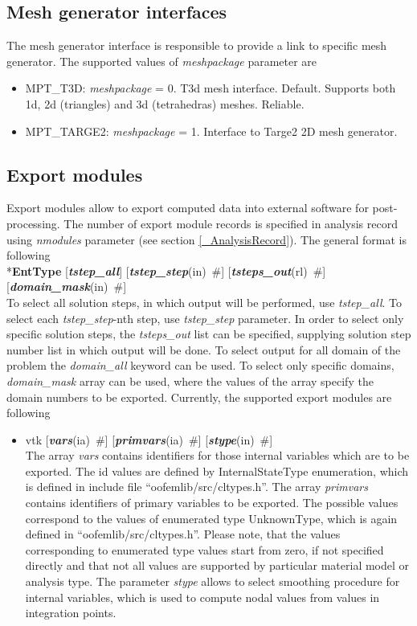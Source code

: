\documentclass[draft]{article}
\newcommand{\param}[1]{{\em #1}}
\newcommand{\keywordnotype}[1]{\mbox{{\it{\bf{#1}}}}}
\newcommand{\keyword}[2]{\mbox{{\keywordnotype{#1}\tiny (#2)}}}
\newcommand{\entKeyword}[1]{\mbox{{*{\bf{#1}}}}}
\newcommand{\field}[2]{\mbox{\keyword{#1}{#2}~\#}}
\newcommand{\optField}[2]{\mbox{[\field{#1}{#2}]}}
\begin{document}
\subsection{Mesh generator interfaces}
\label{meshpackages}
The mesh generator interface is responsible to provide a link to
specific mesh generator. The supported values of \param{meshpackage}
parameter are 
\begin{itemize}
\item
MPT\_T3D:  \param{meshpackage} = 0. T3d mesh interface. Default. Supports both 1d, 2d
(triangles) and 3d (tetrahedras) meshes. Reliable.
\item
MPT\_TARGE2:	\param{meshpackage} = 1. Interface to Targe2 2D
mesh generator.
\end{itemize}
%

\subsection{Export modules}
\label{ExportModulesSec}
Export modules allow to export computed data into external software for
post-processing. The number of export module records is specified in
analysis record using \param{nmodules} parameter (see section \ref{_AnalysisRecord}). The general format
is following\\
\entKeyword{EntType} [\keywordnotype{tstep\_all}]
\optField{tstep\_step}{in} \optField{tsteps\_out}{rl}\newline
[\keywordnotype{domain\_all}] \optField{domain\_mask}{in}\\

To select all solution steps, in which output will be performed, use
\param{tstep\_all}. To select each \param{tstep\_step}-nth step, use
\param{tstep\_step} parameter. In order to select only specific
solution steps, the \param{tsteps\_out} list can be specified,
supplying solution step number list in which output will be done.
To select output for all domain of the problem the \param{domain\_all}
keyword can be used. To select only specific domains,
\param{domain\_mask} array can be used, where the values of the array
specify the domain numbers to be exported.
Currently, the supported export modules are following
\begin{itemize}
\item vtk \optField{vars}{ia} \optField{primvars}{ia}
\optField{stype}{in}\\
The array \param{vars} contains identifiers for those internal
variables which are to be exported. The id values are defined by
InternalStateType enumeration, which is defined in include file
``oofemlib/src/cltypes.h''.
The array \param{primvars}
contains identifiers of primary variables to be exported.
The possible values correspond to the values of enumerated type
UnknownType, which is again defined in ``oofemlib/src/cltypes.h''.
Please note, that the values corresponding to enumerated type values
start from zero, if not specified directly and that not all values are
supported by particular material model or analysis type.
The parameter \param{stype} allows to select smoothing procedure for
internal variables, which is used to compute nodal values from values
in integration points.
\end{itemize}
\end{document}
